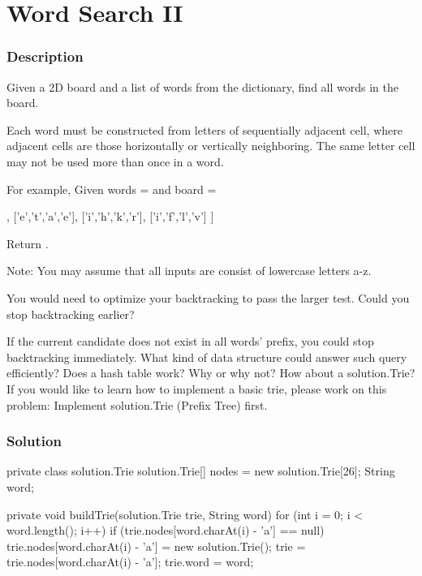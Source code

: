 \newpage

\section{Word Search II} %

\subsubsection{Description}
Given a 2D board and a list of words from the dictionary, find all words in the board.

Each word must be constructed from letters of sequentially adjacent cell, where adjacent cells are those horizontally or vertically neighboring. The same letter cell may not be used more than once in a word.

For example,
Given words =  and board =
\begin{Code}
[
  ['o','a','a','n'],
  ['e','t','a','e'],
  ['i','h','k','r'],
  ['i','f','l','v']
]
\end{Code}
Return .

Note:
You may assume that all inputs are consist of lowercase letters a-z.

You would need to optimize your backtracking to pass the larger test. Could you stop backtracking earlier?

If the current candidate does not exist in all words' prefix, you could stop backtracking immediately. What kind of data structure could answer such query efficiently? Does a hash table work? Why or why not? How about a solution.Trie? If you would like to learn how to implement a basic trie, please work on this problem: Implement solution.Trie (Prefix Tree) first.

\subsubsection{Solution}

\begin{Code}
private class solution.Trie {
    solution.Trie[] nodes = new solution.Trie[26];
    String word;
}

private void buildTrie(solution.Trie trie, String word) {
    for (int i = 0; i < word.length(); i++) {
        if (trie.nodes[word.charAt(i) - 'a'] == null) {
            trie.nodes[word.charAt(i) - 'a'] = new solution.Trie();
        }
        trie = trie.nodes[word.charAt(i) - 'a'];
    }
    trie.word = word;
}

\end{Code}

